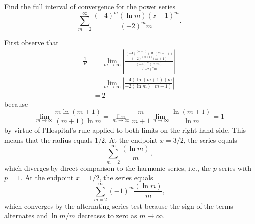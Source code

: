\documentclass{ximera}
\begin{document}
\begin{question}%

Find the full interval of convergence for the power series \[\sum_{m=2}^{\infty} \frac{(-4)^m(\ln m)(x - 1)^m }{(-2)^mm}.\]
\begin{multiplechoice}
\choice[correct]{\(\displaystyle \left[\frac{1}{2},\frac{3}{2}\right)\)}
\choice{\(\displaystyle \left(-1,3\right]\)}
\choice{\(\displaystyle \left[-1,3\right]\)}
\choice{\(\displaystyle \left(-\infty,\infty\right)\)}
\end{multiplechoice}
\begin{feedback}
First observe that 
\[\begin{aligned}
\frac{1}{R} & = \lim_{m\rightarrow \infty} \left| \frac{\frac{(-4)^{(m+1)}(\ln {(m+1)}) }{(-2)^{(m+1)}{(m+1)}} }{\frac{(-4)^m(\ln m) }{(-2)^mm}} \right| \\
& = \lim_{m\rightarrow \infty} \left| \frac{-4(\ln {(m+1)})m }{-2(\ln m){(m+1)} } \right| \\
& = 2
\end{aligned}\]
because \[\lim_{m \rightarrow \infty} \frac{m\ln (m+1)}{(m+1) \ln m} = \lim_{m \rightarrow \infty} \frac{m}{m+1} \lim_{m \rightarrow \infty} \frac{\ln (m+1)}{\ln m} = 1\] by virtue of l'Hospital's rule applied to both limits on the right-hand side.
This means that the radius equals \(1/2\). At the endpoint \(x=3/2\), the series equals \[\sum_{m=2}^{\infty} \frac{(\ln m) }{m },\] which diverges by direct comparison to the harmonic series, i.e., the \(p\)-series with \(p = 1\). At the endpoint \(x=1/2\), the series equals \[\sum_{m=2}^{\infty} (-1)^m\frac{(\ln m) }{m },\] which converges by the alternating series test because the sign of the terms alternates and \(\ln m / m\) decreases to zero as \(m \rightarrow \infty\).
\end{feedback}

\end{question}
\end{document}
